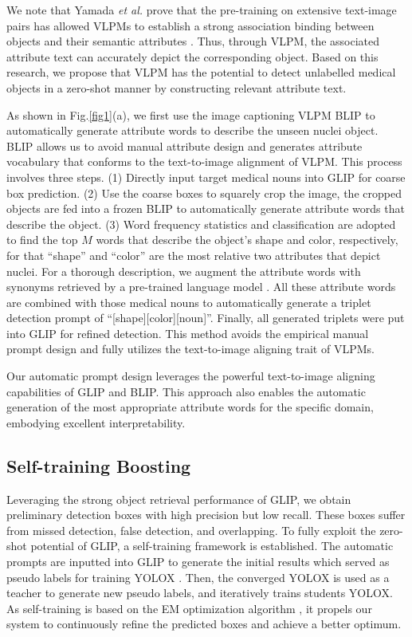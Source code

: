 \documentclass[runningheads]{llncs}
\begin{document}
We note that Yamada \textit{et al.} prove that the pre-training on extensive text-image pairs has allowed VLPMs to establish a strong association binding between objects and their semantic attributes \cite{yamada2022lemons}. Thus, through VLPM, the associated attribute text can accurately depict the corresponding object. Based on this research, we propose that VLPM has the potential to detect unlabelled medical objects in a zero-shot manner by constructing relevant attribute text.

As shown in Fig.\ref{fig1}(a), we first use the image captioning VLPM BLIP \cite{li2022blip} to automatically generate attribute words to describe the unseen nuclei object. BLIP allows us to avoid manual attribute design and generates attribute vocabulary that conforms to the text-to-image alignment of VLPM. This process involves three steps. (1) Directly input target medical nouns into GLIP for coarse box prediction. (2) Use the coarse boxes to squarely crop the image, the cropped objects are fed into a frozen BLIP to automatically generate attribute words that describe the object. (3) Word frequency statistics and classification are adopted to find the top $M$ words that describe the object's shape and color, respectively, for that ``shape'' and ``color'' are the most relative two attributes that depict nuclei. For a thorough description, we augment the attribute words with synonyms retrieved by a pre-trained language model \cite{radford2019language}. All these attribute words are combined with those medical nouns to automatically generate a triplet detection prompt of ``[shape][color][noun]''. Finally, all generated triplets were put into GLIP for refined detection. This method avoids the empirical manual prompt design and fully utilizes the text-to-image aligning trait of VLPMs.

Our automatic prompt design leverages the powerful text-to-image aligning capabilities of GLIP and BLIP. This approach also enables the automatic generation of the most appropriate attribute words for the specific domain, embodying excellent interpretability.
\subsection{Self-training Boosting}
Leveraging the strong object retrieval performance of GLIP, we obtain preliminary detection boxes with high precision but low recall. These boxes suffer from missed detection, false detection, and overlapping. To fully exploit the zero-shot potential of GLIP, a self-training framework is established. The automatic prompts are inputted into GLIP to generate the initial results which served as pseudo labels for training YOLOX \cite{ge2021yolox}. Then, the converged YOLOX is used as a teacher to generate new pseudo labels, and iteratively trains students YOLOX. As self-training is based on the EM optimization algorithm \cite{moon1996expectation}, it propels our system to continuously refine the predicted boxes and achieve a better optimum. 
\end{document}
